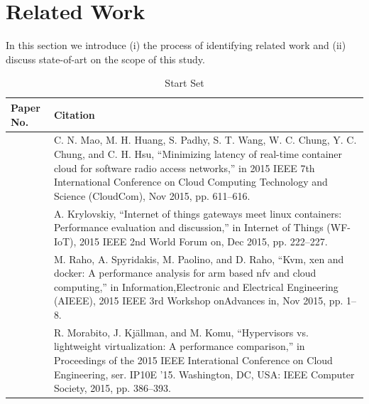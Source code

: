 \chapter{Related Work} \label{section:relatedwork} 
In this section we introduce (i) the process of identifying related work and (ii) discuss state-of-art on the scope of this study. 

\begin{table}[ht]
\renewcommand{\arraystretch}{1.4}
\centering
\caption{Start Set}
\label{lr-startset}
\begin{tabular}{| >{\centering}m{1.3cm} |>{\arraybackslash}m{12.7cm}|}
\hline
\textbf{Paper No.} & \textbf{Citation}\\ \hline
\cite{p1}  & C. N. Mao, M. H. Huang, S. Padhy, S. T. Wang, W. C. Chung, Y. C. Chung, and C. H. Hsu, “Minimizing latency of real-time container cloud for software radio access networks,” in 2015 IEEE 7th International Conference on Cloud Computing Technology and Science (CloudCom), Nov 2015, pp. 611–616.                                  \\
\cite{2iot}  & A. Krylovskiy, “Internet of things gateways meet linux containers: Performance evaluation and discussion,” in Internet of Things (WF-IoT), 2015 IEEE 2nd World Forum on, Dec 2015, pp. 222–227.                                                                                                                                      \\
\cite{p3} & M. Raho, A. Spyridakis, M. Paolino, and D. Raho, “Kvm, xen and docker: A performance analysis for arm based nfv and cloud computing,” in Information,Electronic and Electrical Engineering (AIEEE), 2015 IEEE 3rd Workshop onAdvances in, Nov 2015, pp. 1–8.                                                                         \\
\cite{p4} & R. Morabito, J. Kj\"allman, and M. Komu, “Hypervisors vs. lightweight virtualization: A performance comparison,” in Proceedings of the 2015 IEEE Interational Conference on Cloud Engineering, ser. IP10E ’15. Washington, DC, USA: IEEE Computer Society, 2015, pp. 386–393.                                                      \\

\end{tabular}
\end{table}
